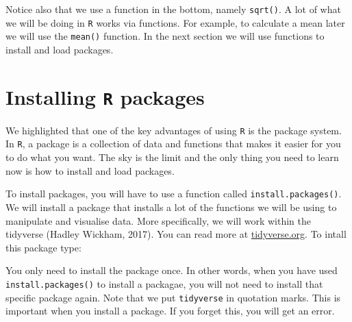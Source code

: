 \documentclass[12pt,oneside]{reedthesis}
\theoremstyle{definition}
\theoremstyle{definition}
\theoremstyle{definition}
\theoremstyle{remark}
\begin{document}
  Notice also that we use a function in the bottom, namely
  \texttt{sqrt()}. A lot of what we will be doing in \texttt{R} works via
  functions. For example, to calculate a mean later we will use the
  \texttt{mean()} function. In the next section we will use functions to
  install and load packages.
  
  \section{\texorpdfstring{Installing \texttt{R}
  packages}{Installing R packages}}\label{installing-r-packages}
  
  We highlighted that one of the key advantages of using \texttt{R} is the
  package system. In \texttt{R}, a package is a collection of data and
  functions that makes it easier for you to do what you want. The sky is
  the limit and the only thing you need to learn now is how to install and
  load packages.
  
  To install packages, you will have to use a function called
  \texttt{install.packages()}. We will install a package that installs a
  lot of the functions we will be using to manipulate and visualise data.
  More specifically, we will work within the tidyverse (Hadley Wickham,
  2017). You can read more at \href{http://tidyverse.org/}{tidyverse.org}.
  To intall this package type:
  \begin{Shaded}
  \begin{Highlighting}[]
  \NormalTok{(}\NormalTok{)}
  \end{Highlighting}
  \end{Shaded}
  You only need to install the package once. In other words, when you have
  used \texttt{install.packages()} to install a packagae, you will not
  need to install that specific package again. Note that we put
  \texttt{tidyverse} in quotation marks. This is important when you
  install a package. If you forget this, you will get an error.
  
\end{document}

